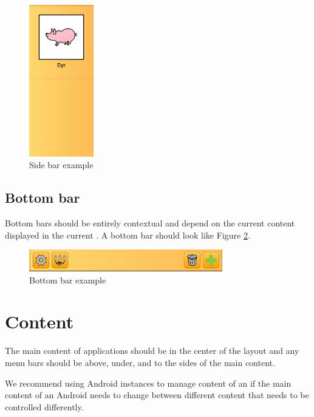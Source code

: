 \begin{figure}[!htbp]
        \centering
        \includegraphics[width=0.25\textwidth]{pictures/application_structure/sidebar}
        \caption{Side bar example}
        \label{fig:side_bar_example}
\end{figure}

\subsection{Bottom bar}
Bottom bars should be entirely contextual and depend on the current content displayed in the current . A bottom bar should look like Figure \ref{fig:bottom_bar_example}.

\begin{figure}[!htbp]
        \centering
        \includegraphics[width=0.75\textwidth]{pictures/application_structure/bottombar}
        \caption{Bottom bar example}
        \label{fig:bottom_bar_example}
\end{figure}

\section{Content}
The main content of applications should be in the center of the layout and any menu bars should be above, under, and to the sides of the main content. 

\begin{note}
We recommend using Android  instances to manage content of an  if the main content of an Android  needs to change between different content that needs to be controlled differently. 
\end{note}
